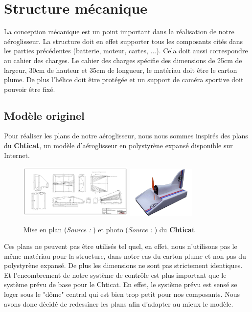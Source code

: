 	\chapter{Structure mécanique}
	La conception mécanique est un point important dans la réalisation de notre aéroglisseur. La structure doit en effet supporter tous les composants cités dans les parties précédentes (batterie, moteur, cartes, ...). Cela doit aussi correspondre au cahier des charges. Le cahier des charges spécifie des dimensions de 25cm de largeur, 30cm de hauteur et 35cm de longueur, le matériau doit être le carton plume. De plus l'hélice doit être protégée et un support de caméra sportive doit pouvoir être fixé. 
		\section{Modèle originel}
		Pour réaliser les plans de notre aéroglisseur, nous nous sommes inspirés des plans du \textbf{Chticat}, un modèle d'aéroglisseur en polystyrène expansé disponible sur Internet.
		\begin{figure}[h]
			\begin{center}
				 \includegraphics[width=0.5\textwidth]{../Illus/Source_Chticat}
				  \includegraphics[width=0.3\textwidth]{../Illus/Chticat}
			\end{center}
			\caption{Mise en plan (\textit{Source :} \cite{PLCHTI}) et photo (\textit{Source :} \cite{chticat}) du \textbf{Chticat}}
			\label{MEPChticat}
		\end{figure}
		Ces plans ne peuvent pas être utilisés tel quel, en effet, nous n'utilisons pas le même matériau pour la structure, dans notre cas du carton plume et non pas du polystyrène expansé. De plus les dimensions ne sont pas strictement identiques. Et l'encombrement de notre système de contrôle est plus important que le système prévu de base pour le Chticat. En effet, le système prévu est sensé se loger sous le "dôme" central qui est bien trop petit pour nos composants. Nous avons donc décidé de redessiner les plans afin d'adapter au mieux le modèle.
